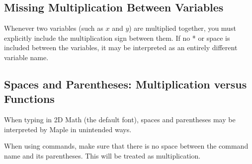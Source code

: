 \subsection{Missing Multiplication Between Variables}

Whenever two variables (such as $x$ and $y$) are multiplied together, you must explicitly include the multiplication sign between them. If no * or space is included between the variables, it may be interpreted as an entirely different variable name.

\begin{maplegroup}
\begin{mapleinput}
\end{mapleinput}
\vspace{.3cm}
\mapleresult
\begin{maplelatex}
\end{maplelatex}
\end{maplegroup}

\subsection{Spaces and Parentheses: Multiplication versus Functions}

When typing in 2D Math (the default font), spaces and parentheses may be interpreted by Maple in unintended ways. 

When using commands, make sure that there is no space between the command name and its parentheses. This will be treated as multiplication.

\begin{maplegroup}
\begin{mapleinput}
\end{mapleinput}
\mapleresult
\begin{maplelatex}
\end{maplelatex}
\end{maplegroup}

